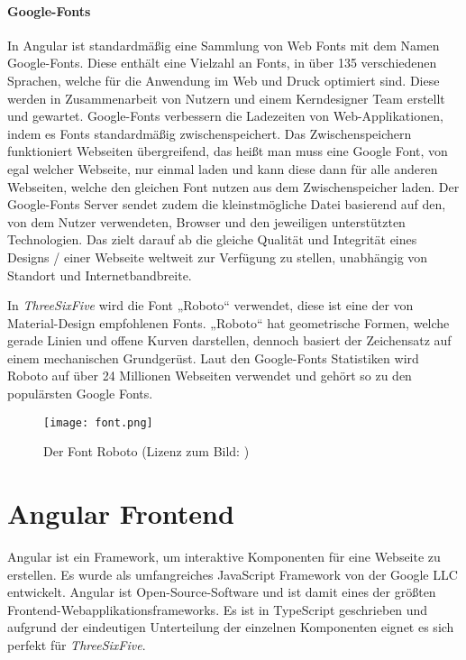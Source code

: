 \paragraph{Google-Fonts}
In Angular ist standardmäßig eine Sammlung von Web Fonts mit dem Namen Google-Fonts\cite{GoogleFonts}. Diese enthält eine Vielzahl an Fonts, in über 135 verschiedenen Sprachen, welche für die Anwendung im Web und Druck optimiert sind. Diese werden in Zusammenarbeit von Nutzern und einem Kerndesigner Team erstellt und gewartet. Google-Fonts verbessern die Ladezeiten von Web-Applikationen, indem es Fonts standardmäßig zwischenspeichert. Das Zwischenspeichern funktioniert Webseiten übergreifend, das heißt man muss eine Google Font, von egal welcher Webseite, nur einmal laden und kann diese dann für alle anderen Webseiten, welche den gleichen Font nutzen aus dem Zwischenspeicher laden. Der Google-Fonts Server sendet zudem die kleinstmögliche Datei basierend auf den, von dem Nutzer verwendeten, Browser und den jeweiligen unterstützten Technologien. Das zielt darauf ab die gleiche Qualität und Integrität eines Designs / einer Webseite weltweit zur Verfügung zu stellen, unabhängig von Standort und Internetbandbreite.

In \textit{ThreeSixFive} wird die Font „Roboto“\cite{Roboto} verwendet, diese ist eine der von Material-Design empfohlenen Fonts. „Roboto“ hat geometrische Formen, welche gerade Linien und offene Kurven darstellen, dennoch basiert der Zeichensatz auf einem mechanischen Grundgerüst. Laut den Google-Fonts Statistiken wird Roboto auf über 24 Millionen Webseiten verwendet und gehört so zu den populärsten Google Fonts.

\begin{figure}[H] \centering \texttt{[image: font.png]} \caption{Der Font Roboto (Lizenz zum Bild: \cite{RobotoBild})} \end{figure}

\section{Angular Frontend}
Angular\cite{AngularDokumentation} ist ein Framework, um interaktive Komponenten für eine Webseite zu erstellen. Es wurde als umfangreiches JavaScript Framework von der Google LLC entwickelt. Angular ist Open-Source-Software und ist damit eines der größten Frontend-Webapplikationsframeworks. Es ist in TypeScript geschrieben und aufgrund der eindeutigen Unterteilung der einzelnen Komponenten eignet es sich perfekt für \textit{ThreeSixFive}.

